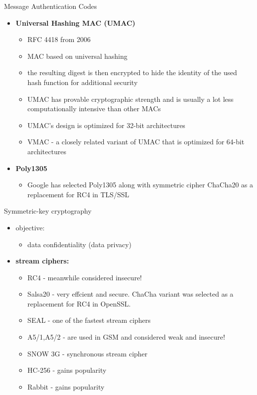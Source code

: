 \documentclass[pdf]{beamer}
\begin{document}
\begin{frame}{Message Authentication Codes}
\begin{itemize}
\item
\textbf{Universal Hashing MAC (UMAC)}
\begin{itemize}
\item
RFC 4418 from 2006
\item
MAC based on universal hashing
\item
the resulting digest is then encrypted to hide the identity of the used hash function for additional security
\item
UMAC has provable cryptographic strength and is usually a lot less computationally intensive than other MACs
\item
UMAC's design is optimized for 32-bit architectures
\item
VMAC - a closely related variant of UMAC that is optimized for 64-bit architectures
\end{itemize}

\item
\textbf{Poly1305}
\begin{itemize}
\item
Google has selected Poly1305 along with symmetric cipher ChaCha20 as a replacement for RC4 in TLS/SSL
\end{itemize}
\end{itemize}
\end{frame}



\begin{frame}{Symmetric-key cryptography}
\begin{itemize}
\item
objective:
\begin{itemize}
\item
data confidentiality (data privacy)
\end{itemize}

\item
\textbf{stream ciphers:}
\begin{itemize}
\item
RC4 - meanwhile considered insecure!
\item
Salsa20 - very effcient and secure. ChaCha variant was selected as a replacement for RC4 in OpenSSL.
\item
SEAL - one of the fastest stream ciphers
\item
A5/1,A5/2 - are used in GSM and considered weak and insecure! 
\item
SNOW 3G - synchronous stream cipher
\item
HC-256 - gains popularity
\item
Rabbit - gains popularity
\end{itemize}

\end{itemize}
\end{frame}
\end{document}
